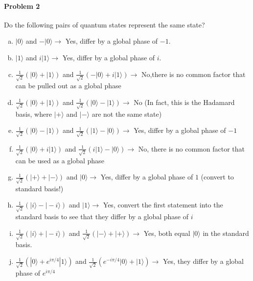 \documentclass[12pt]{article}
\theoremstyle{mytheor}
\begin{document}
\paragraph{Problem 2} Do the following pairs of quantum states represent the same state?
\begin{enumerate}[a)] %
\item $|0\rangle$ and $-|0\rangle \rightarrow$ Yes, differ by a global phase of $-1$.
\item $|1\rangle$ and $i|1\rangle \rightarrow$ Yes, differ by a global phase of $i$.
\item $\frac{1}{\sqrt{2}}(|0\rangle + |1\rangle)$ and $\frac{1}{\sqrt{2}}(-|0\rangle + i|1\rangle) \rightarrow$ No,there is no common factor that can be pulled out as a global phase
\item $\frac{1}{\sqrt{2}}(|0\rangle + |1\rangle)$ and $\frac{1}{\sqrt{2}}(|0\rangle - |1\rangle) \rightarrow$ No (In fact, this is the Hadamard basis, where $|+\rangle$ and $|-\rangle$ are not the same state)
\item $\frac{1}{\sqrt{2}}(|0\rangle - |1\rangle)$ and $\frac{1}{\sqrt{2}}(|1\rangle - |0\rangle) \rightarrow$ Yes, differ by a global phase of $-1$
\item $\frac{1}{\sqrt{2}}(|0\rangle + i|1\rangle)$ and $\frac{1}{\sqrt{2}}(i|1\rangle - |0\rangle) \rightarrow$ No, there is no common factor that can be used as a global phase
\item $\frac{1}{\sqrt{2}}(|+\rangle + |-\rangle)$ and $|0\rangle \rightarrow$ Yes, differ by a global phase of $1$ (convert to standard basis!)
\item $\frac{1}{\sqrt{2}}(|i\rangle - |-i\rangle)$ and $|1\rangle \rightarrow$ Yes, convert the first statement into the standard basis to see that they differ by a global phase of $i$
\item $\frac{1}{\sqrt{2}}(|i\rangle + |-i\rangle)$ and $\frac{1}{\sqrt{2}}(|-\rangle + |+\rangle) \rightarrow$ Yes, both equal $|0\rangle$ in the standard basis.
\item $\frac{1}{\sqrt{2}}(|0\rangle + e^{i\pi/4}|1\rangle)$ and $\frac{1}{\sqrt{2}}(e^{-i\pi/4}|0\rangle + |1\rangle) \rightarrow$ Yes, they differ by a global phase of $e^{i\pi/4}$
\end{enumerate}
\end{document}
